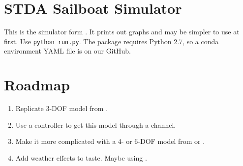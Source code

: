 \documentclass[conference]{IEEEtran}
\begin{document}
\section{STDA Sailboat Simulator}
This is the simulator form \cite{Buehler2018}. It prints out graphs and may be simpler to use at first. Use \lstinline{python run.py}. The package requires Python 2.7, so a conda environment YAML file is on our GitHub.


\section{Roadmap}
\begin{enumerate}
    \item Replicate 3-DOF model from \cite{Alves2010}.
    \item Use a controller to get this model through a channel.
    \item Make it more complicated with a 4- or 6-DOF model from \cite{Buehler2018} or \cite{Setiawan2020}.
    \item Add weather effects to taste. Maybe using \cite{Paravisi2019}.
\end{enumerate}



\end{document}
